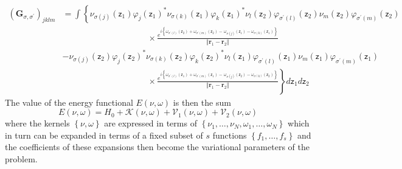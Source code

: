 \documentclass[aps,preprint]{revtex4}%
\begin{document}
\begin{align}
\left(  \mathbf{G}_{\sigma,\sigma^{\prime}}\right)  _{jklm}  &  =%
{\displaystyle\int}
\left\{  \nu_{\sigma\left(  j\right)  }\left(  \mathsf{z}_{1}\right)
\varphi_{j}\left(  \mathsf{z}_{1}\right)  ^{\ast}\nu_{\sigma\left(  k\right)
}\left(  \mathsf{z}_{1}\right)  \varphi_{k}\left(  \mathsf{z}_{1}\right)
^{\ast}\nu_{l}\left(  \mathsf{z}_{2}\right)  \varphi_{\sigma^{\prime}\left(
l\right)  }\left(  \mathsf{z}_{2}\right)  \nu_{m}\left(  \mathsf{z}%
_{2}\right)  \varphi_{\sigma^{\prime}\left(  m\right)  }\left(  \mathsf{z}%
_{2}\right)  \right. \nonumber\\
&  \qquad\qquad\qquad\qquad\qquad\times\frac{e^{i\left\{  \omega
_{\sigma^{\prime}\left(  l\right)  }\left(  \mathsf{z}_{2}\right)
+\omega_{\sigma^{\prime}\left(  m\right)  }\left(  \mathsf{z}_{2}\right)
-\,\omega_{\sigma\left(  j\right)  }\left(  \mathsf{z}_{1}\right)
-\omega_{\sigma\left(  k\right)  }\left(  \mathsf{z}_{1}\right)  \right\}  }%
}{\left\Vert \mathbf{r}_{1}-\mathbf{r}_{2}\right\Vert }\nonumber\\
&  -\nu_{\sigma\left(  j\right)  }\left(  \mathsf{z}_{2}\right)  \varphi
_{j}\left(  \mathsf{z}_{2}\right)  ^{\ast}\nu_{\sigma\left(  k\right)
}\left(  \mathsf{z}_{2}\right)  \varphi_{k}\left(  \mathsf{z}_{2}\right)
^{\ast}\nu_{l}\left(  \mathsf{z}_{1}\right)  \varphi_{\sigma^{\prime}\left(
l\right)  }\left(  \mathsf{z}_{1}\right)  \nu_{m}\left(  \mathsf{z}%
_{1}\right)  \varphi_{\sigma^{\prime}\left(  m\right)  }\left(  \mathsf{z}%
_{1}\right) \nonumber\\
&  \qquad\qquad\qquad\qquad\qquad\times\left.  \frac{e^{i\left\{
\omega_{\sigma^{\prime}\left(  l\right)  }\left(  \mathsf{z}_{1}\right)
+\omega_{\sigma^{\prime}\left(  m\right)  }\left(  \mathsf{z}_{1}\right)
-\,\omega_{\sigma\left(  j\right)  }\left(  \mathsf{z}_{2}\right)
-\omega_{\sigma\left(  k\right)  }\left(  \mathsf{z}_{2}\right)  \right\}  }%
}{\left\Vert \mathbf{r}_{1}-\mathbf{r}_{2}\right\Vert }\right\}
d\mathsf{z}_{1}d\mathsf{z}_{2}%
\end{align}
The value of the energy functional $E\left(  \nu,\omega\right)  $ is then the
sum
\begin{equation}
E\left(  \nu,\omega\right)  =H_{0}+\mathcal{K}\left(  \nu,\omega\right)
+\mathcal{V}_{1}\left(  \nu,\omega\right)  +\mathcal{V}_{2}\left(  \nu
,\omega\right)
\end{equation}
where the kernels $\left\{  \nu,\omega\right\}  $ are expressed in terms of
$\left\{  \nu_{1},\ldots,\nu_{N},\omega_{1},\ldots,\omega_{N}\right\}  $ which
in turn can be expanded in terms of a fixed subset of $s$ functions $\left\{
f_{1},\ldots,f_{s}\right\}  $ and the coefficients of these expansions then
become the variational parameters of the problem.
\end{document}
